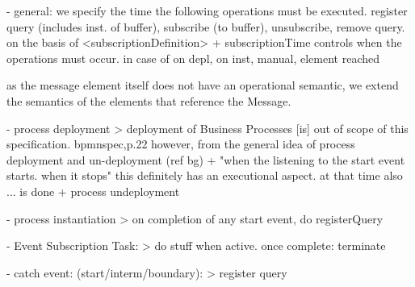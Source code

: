 - general: we specify the time the following operations must be executed. register query (includes inst. of buffer), subscribe (to buffer), unsubscribe, remove query. on the basis of <subscriptionDefinition>
+ subscriptionTime controls when the operations must occur. in case of on depl, on inst, manual, element reached

as the message element itself does not have an operational semantic, we extend the semantics of the elements that reference the Message.

- process deployment
> deployment of Business Processes [is] out of scope of this specification. bpmnspec,p.22
however, from the general idea of process deployment and un-deployment (ref bg) + "when the listening to the start event starts. when it stops" this definitely has an executional aspect.
at that time also ... is done
+ process undeployment

- process instantiation
> on completion of any start event, do registerQuery

- Event Subscription Task: 
> do stuff when active. once complete: terminate

- catch event: (start/interm/boundary): 
> register query





